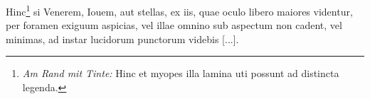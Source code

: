 \pend \pstart [p.~25]Hinc\footnote{\textit{Am Rand mit Tinte:} Hinc et myopes\protect{} illa lamina uti possunt ad distincta legenda.} si Venerem\protect{}, Iouem\protect{}, aut stellas\protect{}, ex iis, quae oculo\protect{} libero maiores videntur, per foramen exiguum aspicias, vel illae omnino sub aspectum non cadent, vel minimas, ad instar lucidorum punctorum videbis [...].